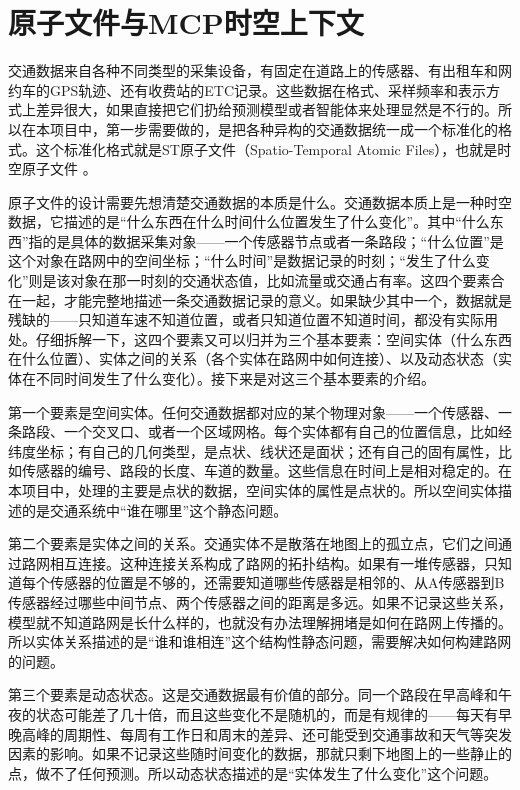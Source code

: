 \section{原子文件与MCP时空上下文}

交通数据来自各种不同类型的采集设备，有固定在道路上的传感器、有出租车和网约车的GPS轨迹、还有收费站的ETC记录。这些数据在格式、采样频率和表示方式上差异很大，如果直接把它们扔给预测模型或者智能体来处理显然是不行的。所以在本项目中，第一步需要做的，是把各种异构的交通数据统一成一个标准化的格式。这个标准化格式就是ST原子文件（Spatio-Temporal Atomic Files），也就是时空原子文件 。

原子文件的设计需要先想清楚交通数据的本质是什么。交通数据本质上是一种时空数据，它描述的是“什么东西在什么时间什么位置发生了什么变化”。其中“什么东西”指的是具体的数据采集对象——一个传感器节点或者一条路段；“什么位置”是这个对象在路网中的空间坐标；“什么时间”是数据记录的时刻；“发生了什么变化”则是该对象在那一时刻的交通状态值，比如流量或交通占有率。这四个要素合在一起，才能完整地描述一条交通数据记录的意义。如果缺少其中一个，数据就是残缺的——只知道车速不知道位置，或者只知道位置不知道时间，都没有实际用处。仔细拆解一下，这四个要素又可以归并为三个基本要素：空间实体（什么东西在什么位置）、实体之间的关系（各个实体在路网中如何连接）、以及动态状态（实体在不同时间发生了什么变化）。接下来是对这三个基本要素的介绍。

第一个要素是空间实体。任何交通数据都对应的某个物理对象——一个传感器、一条路段、一个交叉口、或者一个区域网格。每个实体都有自己的位置信息，比如经纬度坐标；有自己的几何类型，是点状、线状还是面状；还有自己的固有属性，比如传感器的编号、路段的长度、车道的数量。这些信息在时间上是相对稳定的。在本项目中，处理的主要是点状的数据，空间实体的属性是点状的。所以空间实体描述的是交通系统中“谁在哪里”这个静态问题。

第二个要素是实体之间的关系。交通实体不是散落在地图上的孤立点，它们之间通过路网相互连接。这种连接关系构成了路网的拓扑结构。如果有一堆传感器，只知道每个传感器的位置是不够的，还需要知道哪些传感器是相邻的、从A传感器到B传感器经过哪些中间节点、两个传感器之间的距离是多远。如果不记录这些关系，模型就不知道路网是长什么样的，也就没有办法理解拥堵是如何在路网上传播的。所以实体关系描述的是“谁和谁相连”这个结构性静态问题，需要解决如何构建路网的问题。

第三个要素是动态状态。这是交通数据最有价值的部分。同一个路段在早高峰和午夜的状态可能差了几十倍，而且这些变化不是随机的，而是有规律的——每天有早晚高峰的周期性、每周有工作日和周末的差异、还可能受到交通事故和天气等突发因素的影响。如果不记录这些随时间变化的数据，那就只剩下地图上的一些静止的点，做不了任何预测。所以动态状态描述的是“实体发生了什么变化”这个问题。

